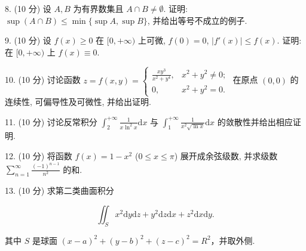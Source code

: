 \documentclass{examcollection}
\renewcommand{\displayformula}[1]{\[#1\]}
\begin{document}
{\begin{minipage}{\textwidth}
8. (10 分) 设 $A, B$ 为有界数集且 $A \cap B \neq \emptyset$. 证明: $\sup(A \cap B) \leq \min\{\sup A, \sup B\}$, 并给出等号不成立的例子.\par
9. (10 分) 设 $f(x) \geq 0$ 在 $[0, +\infty)$ 上可微, $f(0) = 0$, $|f'(x)| \leq f(x)$. 证明: 在 $[0, +\infty)$ 上 $f(x) \equiv 0$.\par
10. (10 分) 讨论函数 $z = f(x, y) = \begin{cases} \frac{xy^3}{x^2 + y^4}, & x^2 + y^2 \neq 0; \\ 0, & x^2 + y^2 = 0. \end{cases}$ 在原点 $(0, 0)$ 的连续性, 可偏导性及可微性, 并给出证明.\par
11. (10 分) 讨论反常积分 $\int_{2}^{+\infty} \frac{1}{x \ln^2 x} \mathrm{d}x$ 与 $\int_{1}^{+\infty} \frac{1}{x^2 \sqrt{\ln x}} \mathrm{d}x$ 的敛散性并给出相应证明.\par
12. (10 分) 将函数 $f(x) = 1 - x^2$ ($0 \leq x \leq \pi$) 展开成余弦级数, 并求级数 $\sum_{n=1}^{\infty} \frac{(-1)^{n-1}}{n^2}$ 的和.\par
13. (10 分) 求第二类曲面积分\par
\displayformula{\iint_ {S} x ^ {2} \mathrm{d} y \mathrm{d} z + y ^ {2} \mathrm{d} z \mathrm{d} x + z ^ {2} \mathrm{d} x \mathrm{d} y.}\par
其中 $S$ 是球面 $(x - a)^2 + (y - b)^2 + (z - c)^2 = R^2$，并取外侧.\par
\end{minipage}}
\ifdim\dimexpr\ht\proofbox+\dp\proofbox\relax>\textheight
\noindent\resizebox{!}{\textheight}{\usebox{\proofbox}}\else\noindent\usebox{\proofbox}\fi\clearpage
\end{document}
